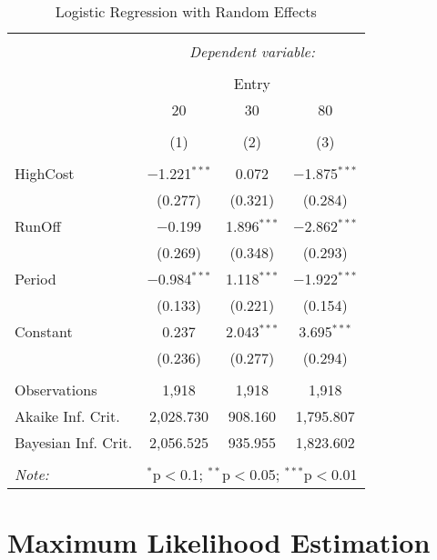 \begin{table}[!htbp] \centering 
	\begin{tabular}{@{\extracolsep{5pt}}lccc} 
		\\[-1.8ex]\hline 
		\hline \\[-1.8ex] 
		& \multicolumn{3}{c}{\textit{Dependent variable:}} \\ 
		\cline{2-4} 
		\\[-1.8ex] & \multicolumn{3}{c}{Entry} \\ 
		& 20 & 30 & 80 \\ 
		\\[-1.8ex] & (1) & (2) & (3)\\ 
		\hline \\[-1.8ex] 
		HighCost & $-$1.221$^{***}$ & 0.072 & $-$1.875$^{***}$ \\ 
		& (0.277) & (0.321) & (0.284) \\ 
		RunOff & $-$0.199 & 1.896$^{***}$ & $-$2.862$^{***}$ \\ 
		& (0.269) & (0.348) & (0.293) \\ 
		Period & $-$0.984$^{***}$ & 1.118$^{***}$ & $-$1.922$^{***}$ \\ 
		& (0.133) & (0.221) & (0.154) \\ 
		Constant & 0.237 & 2.043$^{***}$ & 3.695$^{***}$ \\ 
		& (0.236) & (0.277) & (0.294) \\ 
		\hline \\[-1.8ex] 
		Observations & 1,918 & 1,918 & 1,918 \\ 
		Akaike Inf. Crit. & 2,028.730 & 908.160 & 1,795.807 \\ 
		Bayesian Inf. Crit. & 2,056.525 & 935.955 & 1,823.602 \\ 
		\hline 
		\hline \\[-1.8ex] 
		\textit{Note:}  & \multicolumn{3}{r}{$^{*}$p$<$0.1; $^{**}$p$<$0.05; $^{***}$p$<$0.01} \\ 
	\end{tabular} 
	\caption{Logistic Regression with Random Effects}
	\label{tab:logit_reg} 
\end{table} 

\section{Maximum Likelihood Estimation}

